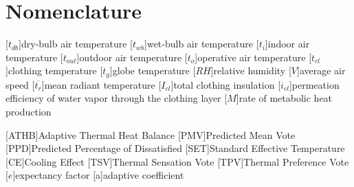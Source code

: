 
\section*{Nomenclature}
\renewcommand{\baselinestretch}{0.75}\normalsize
\renewcommand{\aclabelfont}[1]{\textsc{\acsfont{#1}}}
\begin{acronym}[longest]

    [$t_{db}$]{dry-bulb air temperature}
    [$t_{wb}$]{wet-bulb air temperature}
    [$t_{i}$]{indoor air temperature}
    [$t_{out}$]{outdoor air temperature}
    [$t_{o}$]{operative air temperature}
    [$t_{cl}$]{clothing temperature}
    [$t_{g}$]{globe temperature}
    [$RH$]{relative humidity\acroextra{, \%}}
    [$V$]{average air speed}
    [$\overline{t_{r}}$]{mean radiant temperature}
    [$I_{cl}$]{total clothing insulation}
    [$i_{cl}$]{permeation efficiency of water vapor through the clothing layer}
    [$M$]{rate of metabolic heat production}

    [ATHB]{Adaptive Thermal Heat Balance}
    [PMV]{Predicted Mean Vote}
    [PPD]{Predicted Percentage of Dissatisfied\acroextra{, \%}}
    [SET]{Standard Effective Temperature}
    [CE]{Cooling Effect}
    [TSV]{Thermal Sensation Vote}
    [TPV]{Thermal Preference Vote}
    [$e$]{expectancy factor}
    [a]{adaptive coefficient}

\end{acronym}
\renewcommand{\baselinestretch}{1}\normalsize
